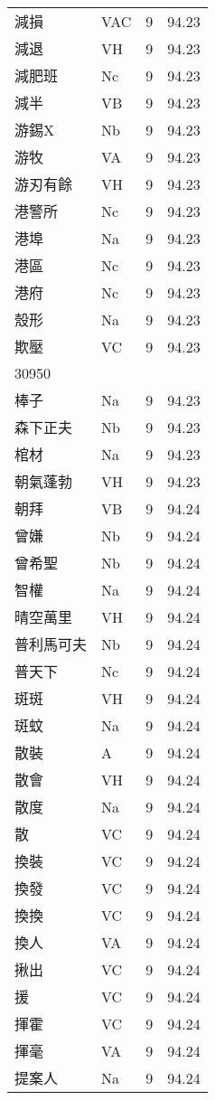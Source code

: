 \documentclass[twocolumn]{book}
\begin{document}
\begin{supertabular}{llrr}
減損 & VAC & 9 &  94.23\\
減退 & VH & 9 &  94.23\\
減肥班 & Nc & 9 &  94.23\\
減半 & VB & 9 &  94.23\\
游錫X & Nb & 9 &  94.23\\
游牧 & VA & 9 &  94.23\\
游刃有餘 & VH & 9 &  94.23\\
港警所 & Nc & 9 &  94.23\\
港埠 & Na & 9 &  94.23\\
港區 & Nc & 9 &  94.23\\
港府 & Nc & 9 &  94.23\\
殼形 & Na & 9 &  94.23\\
欺壓 & VC & 9 &  94.23\\
30950\\
棒子 & Na & 9 &  94.23\\
森下正夫 & Nb & 9 &  94.23\\
棺材 & Na & 9 &  94.23\\
朝氣蓬勃 & VH & 9 &  94.23\\
朝拜 & VB & 9 &  94.24\\
曾嫌 & Nb & 9 &  94.24\\
曾希聖 & Nb & 9 &  94.24\\
智權 & Na & 9 &  94.24\\
晴空萬里 & VH & 9 &  94.24\\
普利馬可夫 & Nb & 9 &  94.24\\
普天下 & Nc & 9 &  94.24\\
斑斑 & VH & 9 &  94.24\\
斑蚊 & Na & 9 &  94.24\\
散裝 & A & 9 &  94.24\\
散會 & VH & 9 &  94.24\\
散度 & Na & 9 &  94.24\\
散 & VC & 9 &  94.24\\
換裝 & VC & 9 &  94.24\\
換發 & VC & 9 &  94.24\\
換換 & VC & 9 &  94.24\\
換人 & VA & 9 &  94.24\\
揪出 & VC & 9 &  94.24\\
援 & VC & 9 &  94.24\\
揮霍 & VC & 9 &  94.24\\
揮毫 & VA & 9 &  94.24\\
提案人 & Na & 9 &  94.24\\

\end{supertabular}
\end{document}
